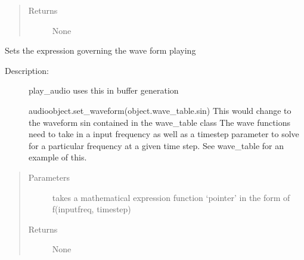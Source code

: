 \documentclass[letterpaper,10pt,english]{sphinxmanual}
\begin{document}
\begin{fulllineitems}
\begin{fulllineitems}
\begin{quote}
\begin{description}
\item[{Returns}] \leavevmode
\sphinxAtStartPar
None

\end{description}\end{quote}

\end{fulllineitems}


\begin{fulllineitems}
\label{\detokenize{dpav:dpav.audio.Audio.set_waveform}}
\sphinxAtStartPar
Sets the expression governing the wave form playing
\begin{description}
\item[{Description:}] \leavevmode
\sphinxAtStartPar
play\_audio uses this in buffer generation

\sphinxAtStartPar
audioobject.set\_waveform(object.wave\_table.sin)
This would change to the waveform sin contained in the wave\_table class
The wave functions need to take in a input frequency as well as a timestep parameter
to solve for a particular frequency at a given time step. See wave\_table for an example of this.

\end{description}
\begin{quote}\begin{description}
\item[{Parameters}] \leavevmode
\sphinxAtStartPar
{} \textendash{} takes a mathematical expression function ‘pointer’ in the form of f(inputfreq, timestep)

\item[{Returns}] \leavevmode
\sphinxAtStartPar
None

\end{description}\end{quote}

\end{fulllineitems}



\end{fulllineitems}
\end{document}
